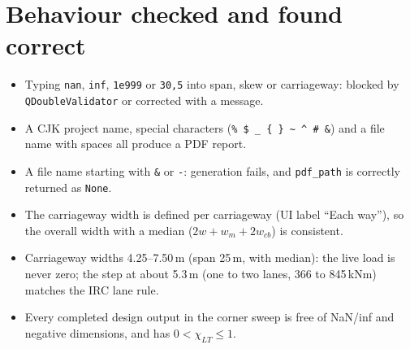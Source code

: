\documentclass[11pt,a4paper]{article}
\begin{document}
\section{Behaviour checked and found correct}
\begin{itemize}[nosep]
  \item Typing \texttt{nan}, \texttt{inf}, \texttt{1e999} or \texttt{30,5} into span, skew or carriageway: blocked by \texttt{QDoubleValidator} or corrected with a message.
  \item A CJK project name, special characters (\texttt{\% \$ \_ \{ \} \textasciitilde{} \textasciicircum{} \# \&}) and a file name with spaces all produce a PDF report.
  \item A file name starting with \texttt{\&} or \texttt{-}: generation fails, and \texttt{pdf\_path} is correctly returned as \texttt{None}.
  \item The carriageway width is defined per carriageway (UI label ``Each way''), so the overall width with a median ($2w + w_m + 2w_{cb}$) is consistent.
  \item Carriageway widths 4.25--7.50\,m (span 25\,m, with median): the live load is never zero; the step at about 5.3\,m (one to two lanes, 366 to 845\,kNm) matches the IRC lane rule.
  \item Every completed design output in the corner sweep is free of NaN/inf and negative dimensions, and has $0 < \chi_{LT} \le 1$.
\end{itemize}

\end{document}
